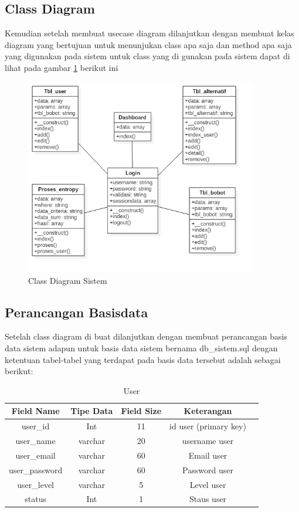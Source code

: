 \pagebreak
\subsection{Class Diagram}
Kemudian setelah membuat usecase diagram dilanjutkan dengan membuat kelas diagram yang bertujuan untuk menunjukan class apa saja dan method apa saja yang digunakan pada sistem untuk class yang di gunakan pada sistem dapat di lihat pada gambar \ref{uml2} berikut ini

\begin{figure}[!htbp]
	\centerline{\includegraphics[width=0.90\textwidth]{figures/uml/buku.png}}
	\caption{Class Diagram Sistem}
	\label{uml2}
\end{figure}

\pagebreak
\subsection{Perancangan Basisdata}
Setelah class diagram di buat dilanjutkan dengan membuat perancangan basis data sistem adapun untuk basis data sistem bernama db\_sistem.sql dengan ketentuan tabel-tabel yang terdapat pada basis data tersebut adalah sebagai berikut:

\begin{table}[h]
\caption{User}
\centering
\begin{tabular}{|c|c|c|c|c|}
\hline
 Field Name & Tipe Data & Field Size&Keterangan\\
\hline
user\_id&Int&11&id user (primary key)\\
\hline
user\_name&varchar&20&username user\\
\hline
user\_email&varchar&60&Email user\\
\hline
user\_password&varchar&60&Password user\\
\hline
user\_level&varchar&5&Level user \\
\hline
status &Int&1&Staus user\\
\hline
\end{tabular}
\label{B41}
\end{table}

